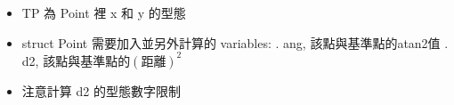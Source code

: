 \begin{itemize}
    \item TP 為 Point 裡 x 和 y 的型態
    \item struct Point 需要加入並另外計算的 variables:
        . ang, 該點與基準點的atan2值
        . d2, 該點與基準點的$(距離)^2$
    \item 注意計算 d2 的型態數字限制 
\end{itemize}